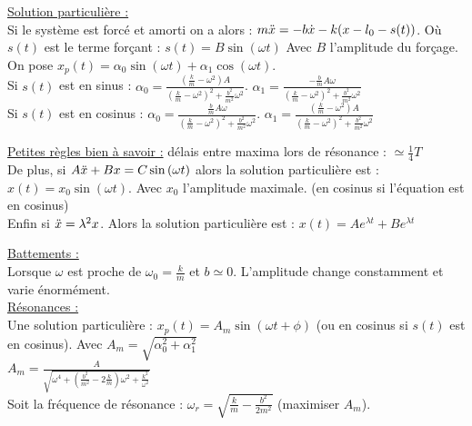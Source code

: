 \documentclass[../main.tex]{subfiles}
\begin{document}
\quad \underline{Solution particulière :}\\
Si le système est forcé et amorti on a alors : $m \Ddot{x} = -b \dot{x} -k(x-l_0-s(t))$. Où $s(t)$ est le terme forçant : $s(t) = B \sin(\omega t)$ Avec $B$ l'amplitude du forçage.\\

On pose $x_p(t) = \alpha_0 \sin(\omega t) + \alpha_1 \cos(\omega t)$. \\

Si $s(t)$ est en sinus : $\alpha_0 = \frac{(\frac{k}{m}-\omega^2)A}{(\frac{k}{m}-\omega^2)^2 + \frac{b^2}{m^2} \omega^2}$. $\alpha_1 = \frac{-\frac{b}{m}A \omega}{(\frac{k}{m}-\omega^2)^2 + \frac{b^2}{m^2} \omega^2}$\\

Si $s(t)$ est en cosinus : $\alpha_0 = \frac{\frac{b}{m}A \omega}{(\frac{k}{m}-\omega^2)^2 + \frac{b^2}{m^2} \omega^2}$. $\alpha_1 = \frac{(\frac{k}{m}-\omega^2)A}{(\frac{k}{m}-\omega^2)^2 + \frac{b^2}{m^2} \omega^2}$

\underline{Petites règles bien à savoir :} délais entre maxima lors de résonance : $\simeq \frac{1}{4}T$\\
De plus, si $A \Ddot{x} + Bx = C \sin{(\omega t)}$ alors la solution particulière est : $x(t) = x_0 \sin(\omega t)$. Avec $x_0$ l'amplitude maximale. (en cosinus si l'équation est en cosinus)\\
Enfin si $\Ddot{x} = \lambda^2 x$. Alors la solution particulière est : $x(t) = A e^{\lambda t} + B e^{\lambda t}$

\quad \underline{Battements :}\\
Lorsque $\omega$ est proche de $\omega_0 = \frac{k}{m}$ et $b\simeq0$. L'amplitude change constamment et varie énormément.\\

\quad \underline{Résonances :}\\
Une solution particulière : $x_p(t) = A_m \sin(\omega t+\phi)$ (ou en cosinus si $s(t)$ est en cosinus). Avec $A_m = \sqrt{\alpha_0^2 + \alpha_1^2}$\\
$A_m = \frac{A}{\sqrt{\omega^4 + (\frac{b^2}{m^2} - 2\frac{k}{m})\omega^2 + \frac{k^2}{\omega^2}}}$\\
Soit la fréquence de résonance : $\omega_r = \sqrt{\frac{k}{m} - \frac{b^2}{2m^2}}$ (maximiser $A_m$).
\end{document}
